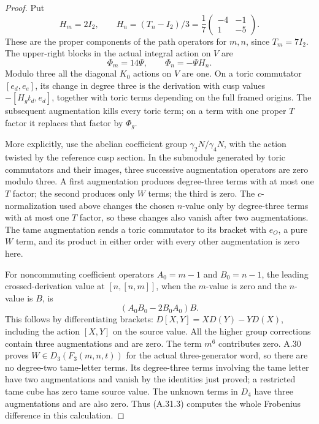 \begin{proof}
Put
\[
 H_m=2I_2,\qquad
 H_n=(T_n-I_2)/3
 =\frac17\begin{pmatrix}-4&-1\\1&-5\end{pmatrix}.
 \tag{A.35.3}
\]
These are the proper components of the path operators
for $m,n$, since $T_m=7I_2$. The upper-right blocks in
the actual integral action on $V$ are
\[
                  \Phi_m=14\Psi,\qquad
                  \Phi_n=-\Psi H_n.
 \tag{A.35.4}
\]
Modulo three all the diagonal $K_0$ actions on $V$
are one. On a toric commutator $[e_d,e_e]$, its
change in degree three is the derivation with cusp
values $-[H_g t_d,e_d]$, together with toric
terms depending on the full framed origins.
The subsequent augmentation kills every toric term;
on a term with one proper $T$ factor it replaces
that factor by $\Phi_g$.

More explicitly, use the abelian coefficient group
$\gamma_2N/\gamma_4N$, with the action twisted by the
reference cusp section. In the submodule generated
by toric commutators and their images, three successive
augmentation operators are zero modulo three. A first
augmentation produces degree-three terms with at most
one $T$ factor; the second produces only $W$ terms;
the third is zero. The $c$-normalization used above
changes the chosen $n$-value only by degree-three
terms with at most one $T$ factor, so these changes
also vanish after two augmentations. The tame
augmentation sends a toric commutator to its bracket
with $e_O$, a pure $W$ term, and its product in either
order with every other augmentation is zero here.

For noncommuting coefficient operators $A_0=m-1$ and
$B_0=n-1$, the leading crossed-derivation value at
$[n,[n,m]]$, when the $m$-value is zero and the
$n$-value is $B$, is
\[
                   (A_0B_0-2B_0A_0)B.
 \tag{A.35.5}
\]
This follows by differentiating brackets:
$D[X,Y]=X D(Y)-Y D(X)$, including the action
$[X,Y]$ on the source value. All the higher group
corrections contain three augmentations and are
zero. The term $m^6$ contributes zero. A.30 proves
$W\in D_3(F_3(m,n,t))$ for the actual three-generator
word, so there are no degree-two tame-letter terms.
Its degree-three terms involving the tame letter have
two augmentations and vanish by the identities just
proved; a restricted tame cube has zero tame source
value. The unknown terms in $D_4$ have three augmentations
and are also zero.
Thus (A.31.3) computes the whole Frobenius difference
in this calculation.


\end{proof}
